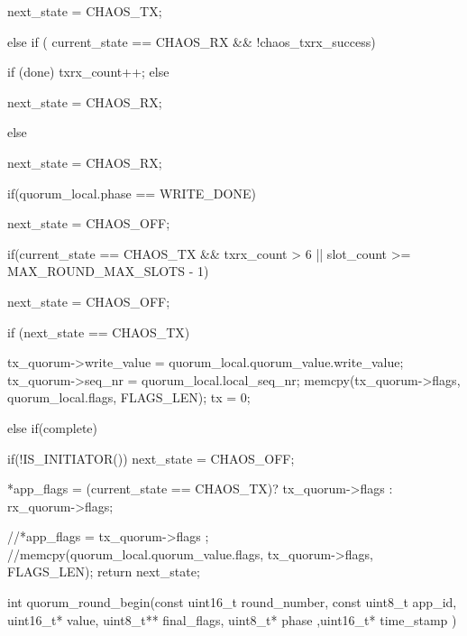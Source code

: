 {{{        next_state = CHAOS_TX;
        
        }
        
        else if ( current_state == CHAOS_RX && !chaos_txrx_success){

        if (done){
         txrx_count++;
         }
         else{
         next_state = CHAOS_RX;

        }
        }
        
        else{
         next_state = CHAOS_RX;
        
        }
        
        
        
        }

   if(quorum_local.phase == WRITE_DONE){
    
        next_state = CHAOS_OFF;
    
        }
        
     if(current_state == CHAOS_TX && txrx_count > 6 || slot_count >= MAX_ROUND_MAX_SLOTS - 1){

        next_state = CHAOS_OFF;
       

        }


    if (next_state == CHAOS_TX){

                 tx_quorum->write_value =  quorum_local.quorum_value.write_value;
                 tx_quorum->seq_nr = quorum_local.local_seq_nr;
                 memcpy(tx_quorum->flags, quorum_local.flags, FLAGS_LEN);
                 tx = 0;

                }



    else if(complete)
        {
            if(!IS_INITIATOR()){
            next_state = CHAOS_OFF;
            }


        }

   *app_flags = (current_state == CHAOS_TX)? tx_quorum->flags : rx_quorum->flags;

    //*app_flags = tx_quorum->flags ;
    //memcpy(quorum_local.quorum_value.flags, tx_quorum->flags, FLAGS_LEN);
   return next_state;

}




 int quorum_round_begin(const uint16_t round_number, const uint8_t app_id, uint16_t* value, uint8_t** final_flags, uint8_t* phase ,uint16_t* time_stamp )

